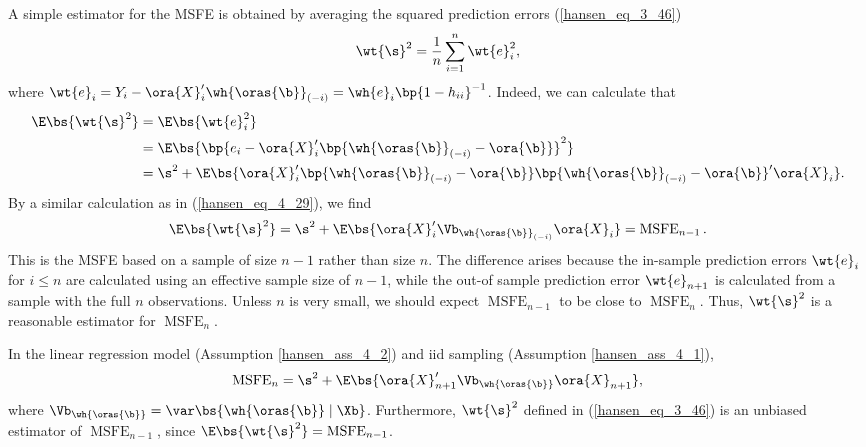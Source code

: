 A simple estimator for the MSFE is obtained by averaging the squared prediction errors (\ref{hansen_eq_3_46})
\begin{equation}
    \notag
    \wt{\s}^2 = \frac{1}{n} \sum_{i=1}^{n}\wt{e}_i^2,
\end{equation}
where $\wt{e}_i = Y_i - \ora{X}_i^\prime \wh{\oras{\b}}_{(-i)} = \wh{e}_i \bp{1-h_{ii}}^{-1}$. Indeed, we can calculate that 
\begin{equation}
    \notag
    \begin{aligned}
        \E\bs{\wt{\s}^2} & = \E\bs{\wt{e}_i^2} \\
        & = \E\bs{\bp{e_i - \ora{X}_i^\prime \bp{\wh{\oras{\b}}_{(-i)} - \ora{\b} }}^2} \\
        & = \s^2 + \E\bs{\ora{X}_i^\prime \bp{\wh{\oras{\b}}_{(-i)} - \ora{\b}} \bp{\wh{\oras{\b}}_{(-i)} - \ora{\b}}^\prime \ora{X}_i}.
    \end{aligned}
\end{equation}
By a similar calculation as in (\ref{hansen_eq_4_29}), we find 
\begin{equation}
    \notag
    \E\bs{\wt{\s}^2} = \s^2 + \E\bs{\ora{X}_{i}^\prime \Vb_{\wh{\oras{\b}}_{(-i)}} \ora{X}_{i}} = \operatorname{MSFE}_{n-1}.
\end{equation}
This is the MSFE based on a sample of size $n-1$ rather than size $n$. The difference arises because the in-sample prediction errors $\wt{e}_i$ for $i \leq n$ are calculated using an effective sample size of $n-1$, while the out-of sample prediction error $\wt{e}_{n+1}$ is calculated from a sample with the full $n$ observations. Unless $n$ is very small, we should expect $\operatorname{MSFE}_{n-1}$ to be close to $\operatorname{MSFE}_{n}$. Thus, $\wt{\s}^2$ is a reasonable estimator for $\operatorname{MSFE}_{n}$.

\begin{theorem}[MSFE]
    \label{hansen_thm_4_8}
    In the linear regression model (Assumption \ref{hansen_ass_4_2}) and iid sampling (Assumption \ref{hansen_ass_4_1}),
    \begin{equation}
        \notag
        \operatorname{MSFE}_n = \s^2 + \E\bs{\ora{X}_{n+1}^\prime \Vb_{\wh{\oras{\b}}} \ora{X}_{n+1}},
    \end{equation}
    where $\Vb_{\wh{\oras{\b}}} = \var\bs{\wh{\oras{\b}} \mid \Xb}$. Furthermore, $\wt{\s}^2$ defined in (\ref{hansen_eq_3_46}) is an unbiased estimator of $\operatorname{MSFE}_{n-1}$, since $\E\bs{\wt{\s}^2} = \operatorname{MSFE}_{n-1}$.
\end{theorem}

